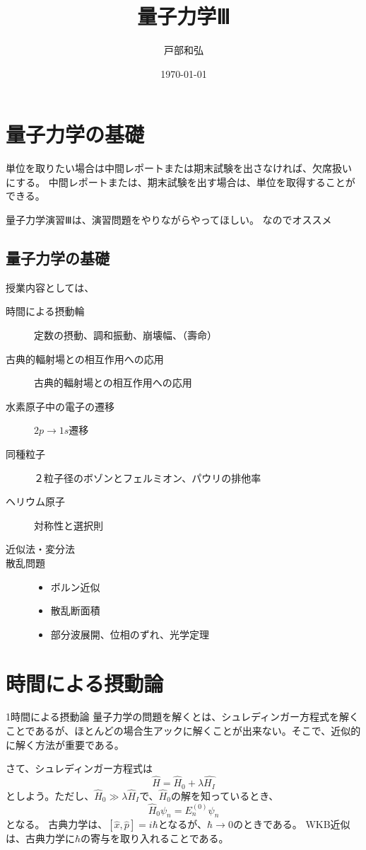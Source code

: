\documentclass[titlepage]{ltjsarticle}
\begin{document}
\title{量子力学Ⅲ}
\author{戸部和弘}
\date{\today}
\maketitle

\tableofcontents

\section*{量子力学の基礎}
単位を取りたい場合は中間レポートまたは期末試験を出さなければ、欠席扱いにする。
中間レポートまたは、期末試験を出す場合は、単位を取得することができる。

量子力学演習Ⅲは、演習問題をやりながらやってほしい。
なのでオススメ

\subsection*{量子力学の基礎}
授業内容としては、
\begin{description}
  \item[時間による摂動輪] 定数の摂動、調和振動、崩壊幅、（壽命）
  \item[古典的輻射場との相互作用への応用] 古典的輻射場との相互作用への応用
  \item[水素原子中の電子の遷移] \(2p\rightarrow 1s\)遷移
  \item[同種粒子] ２粒子径のボゾンとフェルミオン、パウリの排他率
  \item[ヘリウム原子] 対称性と選択則
  \item[近似法・変分法] 
  \item[散乱問題] 
  \begin{itemize}
    \item ボルン近似
    \item 散乱断面積
    \item 部分波展開、位相のずれ、光学定理
  \end{itemize}
\end{description}

\section{時間による摂動論}
1時間による摂動論
量子力学の問題を解くとは、シュレディンガー方程式を解くことであるが、ほとんどの場合生アックに解くことが出来ない。そこで、近似的に解く方法が重要である。

さて、シュレディンガー方程式は
\begin{equation}
  \hat{H} = \hat{H}_0 + \lambda \hat{H_I}
\end{equation}
としよう。ただし、\(\hat{H}_0 \gg \lambda \hat{H}_I\)で、\(\hat{H}_0\)の解を知っているとき、
\begin{equation}
  \hat{H}_0 \psi_n = E_n^{(0)} \psi_n
\end{equation}
となる。
古典力学は、\([\hat{x},\hat{p}]=i\hbar\)となるが、\(\hbar\to 0\)のときである。
WKB近似は、古典力学に\(\hbar\)の寄与を取り入れることである。
\end{document}
